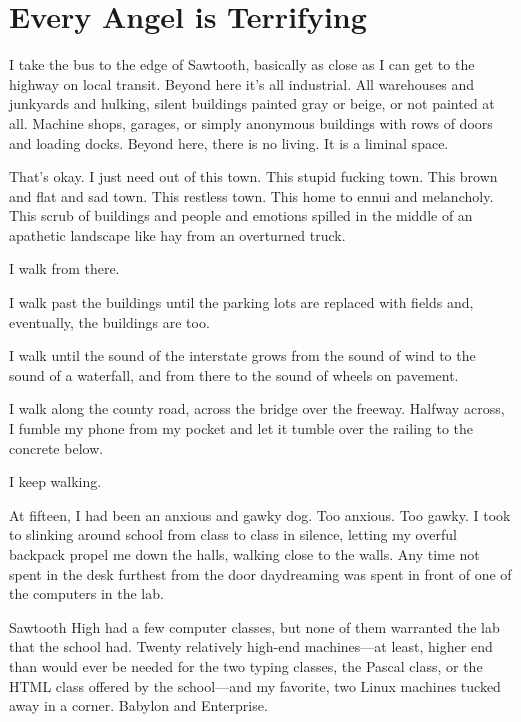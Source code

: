 \hypertarget{every-angel-is-terrifying}{%
\chapter{Every Angel is Terrifying}\label{every-angel-is-terrifying}}

\vspace{0.3cm}

I take the bus to the edge of Sawtooth, basically as close as I can get to the highway on local transit. Beyond here it's all industrial. All warehouses and junkyards and hulking, silent buildings painted gray or beige, or not painted at all. Machine shops, garages, or simply anonymous buildings with rows of doors and loading docks. Beyond here, there is no living. It is a liminal space.

That's okay. I just need out of this town. This stupid fucking town. This brown and flat and sad town. This restless town. This home to ennui and melancholy. This scrub of buildings and people and emotions spilled in the middle of an apathetic landscape like hay from an overturned truck.

I walk from there.

I walk past the buildings until the parking lots are replaced with fields and, eventually, the buildings are too.

I walk until the sound of the interstate grows from the sound of wind to the sound of a waterfall, and from there to the sound of wheels on pavement.\newpage

I walk along the county road, across the bridge over the freeway. Halfway across, I fumble my phone from my pocket and let it tumble over the railing to the concrete below.

I keep walking.

\secdiv{}

\noindent At fifteen, I had been an anxious and gawky dog. Too anxious. Too gawky. I took to slinking around school from class to class in silence, letting my overful backpack propel me down the halls, walking close to the walls. Any time not spent in the desk furthest from the door daydreaming was spent in front of one of the computers in the lab.

Sawtooth High had a few computer classes, but none of them warranted the lab that the school had. Twenty relatively high-end machines---at least, higher end than would ever be needed for the two typing classes, the Pascal class, or the HTML class offered by the school---and my favorite, two Linux machines tucked away in a corner. Babylon and Enterprise.

